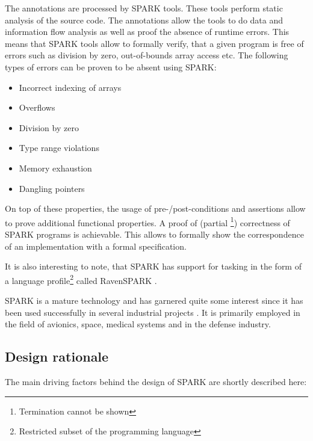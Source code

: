 The annotations are processed by SPARK tools. These tools perform static
analysis of the source code. The annotations allow the tools to do data and
information flow analysis as well as proof the absence of runtime errors. This
means that SPARK tools allow to formally verify, that a given program is free
of errors such as division by zero, out-of-bounds array access etc. The
following types of errors can be proven to be absent using SPARK:

\begin{itemize}
	\item Incorrect indexing of arrays
	\item Overflows
	\item Division by zero
	\item Type range violations
	\item Memory exhaustion
	\item Dangling pointers
\end{itemize}

On top of these properties, the usage of pre-/post-conditions and assertions
allow to prove additional functional properties. A proof of (partial
\footnote{Termination cannot be shown}) correctness of SPARK programs is
achievable. This allows to formally show the correspondence of an implementation
with a formal specification.

It is also interesting to note, that SPARK has support for tasking in the form
of a language profile\footnote{Restricted subset of the programming language}
called RavenSPARK \cite{RavenSPARK}.

SPARK is a mature technology and has garnered quite some interest since it has
been used successfully in several industrial projects
\cite{Chapman:2000:IES:369264.369270}. It is primarily employed in the field of
avionics, space, medical systems and in the defense industry.

\subsection{Design rationale}
The main driving factors behind the design of SPARK are shortly described here:

